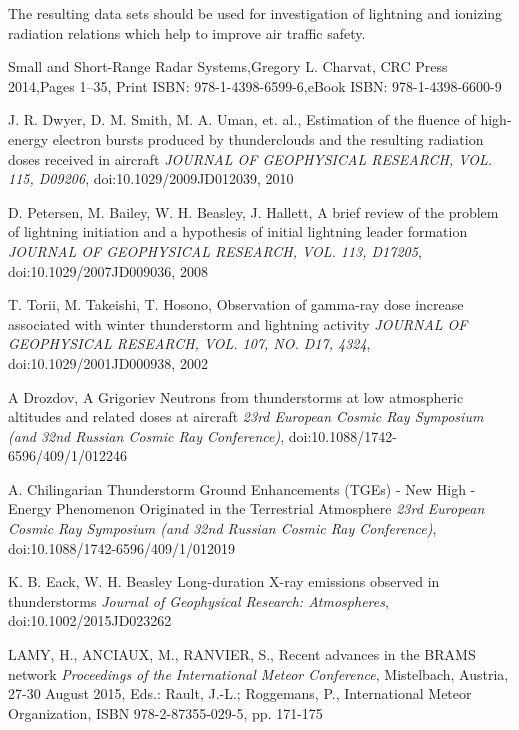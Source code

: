 \documentclass[twoside]{ctuthesis}
\theoremstyle{plain}
\theoremstyle{definition}
\theoremstyle{note}
\begin{document}
The resulting data sets should be used for investigation of lightning and ionizing radiation relations which help to improve air traffic safety. 

\appendix

\begin{thebibliography}{99}




Small and Short-Range Radar Systems,Gregory L. Charvat, CRC Press 2014,Pages 1–35, Print ISBN: 978-1-4398-6599-6,eBook ISBN: 978-1-4398-6600-9

J. R. Dwyer, D. M. Smith, M. A. Uman, et. al.,
Estimation of the fluence of high-energy electron bursts produced by thunderclouds and the resulting radiation doses received in aircraft
\emph{JOURNAL OF GEOPHYSICAL RESEARCH, VOL. 115, D09206}, doi:10.1029/2009JD012039, 2010

D. Petersen, M. Bailey, W. H. Beasley, J. Hallett,
A brief review of the problem of lightning initiation and a hypothesis of initial lightning leader formation
\emph{JOURNAL OF GEOPHYSICAL RESEARCH, VOL. 113, D17205}, doi:10.1029/2007JD009036, 2008

T. Torii, M. Takeishi, T. Hosono,
Observation of gamma-ray dose increase associated with winter thunderstorm and lightning activity
\emph{JOURNAL OF GEOPHYSICAL RESEARCH, VOL. 107, NO. D17, 4324}, doi:10.1029/2001JD000938, 2002

A Drozdov, A Grigoriev
Neutrons from thunderstorms at low atmospheric altitudes and related doses at aircraft
\emph{23rd European Cosmic Ray Symposium (and 32nd Russian Cosmic Ray Conference)}, doi:10.1088/1742-6596/409/1/012246

A. Chilingarian
Thunderstorm Ground Enhancements (TGEs) - New High - Energy Phenomenon Originated in the Terrestrial Atmosphere
\emph{23rd European Cosmic Ray Symposium (and 32nd Russian Cosmic Ray Conference)}, doi:10.1088/1742-6596/409/1/012019

K. B. Eack, W. H. Beasley
Long-duration X-ray emissions observed in thunderstorms
\emph{Journal of Geophysical Research: Atmospheres}, doi:10.1002/2015JD023262

LAMY, H., ANCIAUX, M., RANVIER, S.,
Recent advances in the BRAMS network
\emph{Proceedings of the International Meteor Conference}, Mistelbach, Austria, 27-30 August 2015, Eds.: Rault, J.-L.; Roggemans, P., International Meteor Organization, ISBN 978-2-87355-029-5, pp. 171-175


\end{thebibliography}
\end{document}
